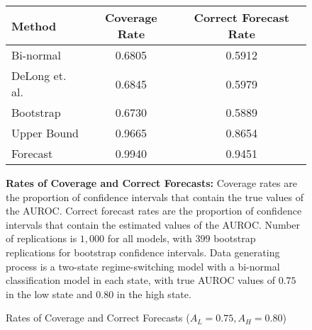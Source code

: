 


\begin{figure}[h!]

\begin{center}

    \caption{Rates of Coverage and Correct Forecasts ($A_L = 0.75, A_H = 0.80$)} \label{fig:Coverage1}

    \begin{tabular}{l c c }

    Method & Coverage Rate & Correct Forecast Rate \\

    \hline
    
    
    
          Bi-normal &  0.6805 & 0.5912 \\
     DeLong et. al. &  0.6845 & 0.5979 \\
          Bootstrap &  0.6730 & 0.5889 \\
        Upper Bound &  0.9665 & 0.8654 \\
           Forecast &  0.9940 & 0.9451 \\

    \hline

    \end{tabular}


\end{center}

    \footnotesize

        \textbf{Rates of Coverage and Correct Forecasts:}
        Coverage rates are the proportion of confidence intervals that contain the true values of the AUROC.
        Correct forecast rates are the proportion of confidence intervals that contain the estimated values of the AUROC.
        Number of replications is $1,000$ for all models, with $399$ bootstrap replications for bootstrap confidence intervals.
        Data generating process is a two-state regime-switching model with a bi-normal classification model in each state,
        with true AUROC values of $0.75$ in the low state and $0.80$ in the high state.





\end{figure}



